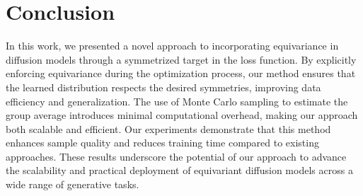 \section{Conclusion}
\label{sec:conclusion}

In this work, we presented a novel approach to incorporating equivariance in diffusion models through a symmetrized target in the loss function. By explicitly enforcing equivariance during the optimization process, our method ensures that the learned distribution respects the desired symmetries, improving data efficiency and generalization. The use of Monte Carlo sampling to estimate the group average introduces minimal computational overhead, making our approach both scalable and efficient. Our experiments demonstrate that this method enhances sample quality and reduces training time compared to existing approaches. These results underscore the potential of our approach to advance the scalability and practical deployment of equivariant diffusion models across a wide range of generative tasks.